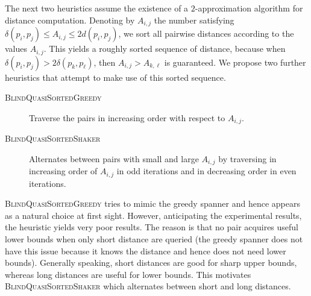 \documentclass[a4paper,UKenglish,cleveref, autoref]{lipics-v2019}
\newcommand{\dist}{\delta}
\def\marrow{\marginpar[\hfill$\longrightarrow$]{$\longleftarrow$}}
\def\michael#1{\textcolor{red}{\textsc{Michael says: }{\marrow\sf #1}}}
\begin{document}

The next two heuristics assume the existence of a $2$-approximation algorithm for distance
computation. Denoting by $A_{i,j}$ the number satisfying $\dist(p_i,p_j)\leq A_{i,j}\leq 2 d(p_i,p_j)$,
we sort all pairwise distances according to the values $A_{i,j}$.
This yields a roughly sorted sequence of distance, because when $\dist(p_i,p_j)>2\dist(p_k,p_\ell)$,
then $A_{i,j}>A_{k,\ell}$ is guaranteed.
We propose two further heuristics that attempt to make use of this sorted sequence.
\begin{description}
\item [\textsc{BlindQuasiSortedGreedy}] Traverse the pairs in increasing order with respect to $A_{i,j}$.
\item [\textsc{BlindQuasiSortedShaker}] Alternates between pairs with small and large $A_{i,j}$
by traversing in increasing order of $A_{i,j}$ in odd iterations and in decreasing order
in even iterations.
\end{description}

\textsc{BlindQuasiSortedGreedy} tries to mimic the greedy spanner and hence appears as a natural
choice at first sight. However, anticipating the experimental results, the heuristic yields very poor
results. The reason is that no pair acquires useful lower bounds when only short distance are queried
(the greedy spanner does not have this issue because it knows the distance and hence does not need
lower bounds).
Generally speaking, short distances are good for sharp upper bounds, whereas long distances are
useful for lower bounds. This motivates \textsc{BlindQuasiSortedShaker}
which alternates between short and long distances.
\end{document}

